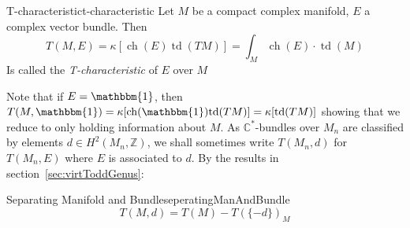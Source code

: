 \documentclass{book}
\newcommand{\Z}{{\mathbb{Z}}}
\newcommand{\C}{{\mathbb{C}}}
\newcommand{\ch}{{\operatorname{ch}}}
\newcommand{\td}{{\operatorname{td}}}
\renewcommand{\ch}{{\operatorname{ch}}}
\begin{document}
\begin{defn}{T-characteristic}{t-characteristic}
  Let $M$ be a compact complex manifold, $E$ a complex vector bundle. Then
  \[
    T(M, E) = \kappa[\ch(E)\td(TM)] = \int_M \ch(E)\cdot \td(M)
  \]
  Is called the \emph{T-characteristic} of $E$ over $M$
\end{defn}
Note that if $E = \mathbbm{1}$, then $T(M,\mathbbm{1}) = \kappa[\ch(\mathbbm{1})\td(TM)] = \kappa[\td(TM)]$
showing that we reduce to only holding information about $M$.
As $\C^*$-bundles over $M_n$ are classified by elements $d \in H^2(M_n, \Z)$, we shall sometimes write $T(M_n,
d)$ for $T(M_n, E)$ where $E$ is associated to $d$. By the results in section~\ref{sec:virtToddGenus}:
\begin{prop}{Separating Manifold and Bundle}{seperatingManAndBundle}
  \[
  T(M, d) = T(M) - T(\{-d\})_M
\]
\end{prop}
\end{document}
